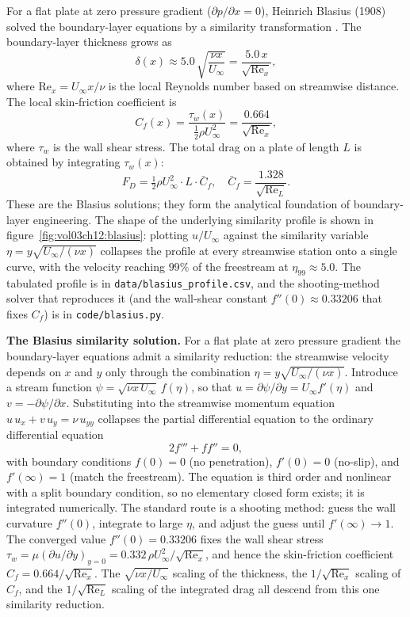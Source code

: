 

For a flat plate at zero pressure gradient ($\partial p/\partial x
= 0$), Heinrich Blasius (1908) solved the boundary-layer equations
by a similarity transformation
\cite{text:schlichting-boundary-layer}. The boundary-layer
thickness grows as
\[
\delta(x) \approx 5.0\,\sqrt{\frac{\nu x}{U_\infty}} =
\frac{5.0\,x}{\sqrt{\text{Re}_x}},
\]
where $\text{Re}_x = U_\infty x/\nu$ is the local Reynolds number
based on streamwise distance. The local skin-friction coefficient
is
\[
C_f(x) = \frac{\tau_w(x)}{\tfrac{1}{2}\rho U_\infty^2} =
\frac{0.664}{\sqrt{\text{Re}_x}},
\]
where $\tau_w$ is the wall shear stress. The total drag on a plate
of length $L$ is obtained by integrating $\tau_w(x)$:
\[
F_D = \tfrac{1}{2}\rho U_\infty^2 \cdot L \cdot \bar{C}_f, \quad
\bar{C}_f = \frac{1.328}{\sqrt{\text{Re}_L}}.
\]
These are the Blasius solutions; they form the analytical
foundation of boundary-layer engineering. The shape of the
underlying similarity profile is shown in
figure~\ref{fig:vol03ch12:blasius}: plotting $u/U_\infty$ against
the similarity variable $\eta = y\sqrt{U_\infty/(\nu x)}$ collapses
the profile at every streamwise station onto a single curve, with
the velocity reaching $99\%$ of the freestream at
$\eta_{99}\approx5.0$. The tabulated profile is in
\texttt{data/blasius\_profile.csv}, and the shooting-method solver
that reproduces it (and the wall-shear constant $f''(0)\approx
0.33206$ that fixes $C_f$) is in \texttt{code/blasius.py}.



\begin{mastery}
\textbf{The Blasius similarity solution.} For a flat plate at zero
pressure gradient the boundary-layer equations admit a similarity
reduction: the streamwise velocity depends on $x$ and $y$ only
through the combination $\eta = y\sqrt{U_\infty/(\nu x)}$. Introduce
a stream function $\psi = \sqrt{\nu x\,U_\infty}\,f(\eta)$, so that
$u = \partial\psi/\partial y = U_\infty f'(\eta)$ and $v =
-\partial\psi/\partial x$. Substituting into the streamwise
momentum equation $u\,u_x + v\,u_y = \nu\,u_{yy}$ collapses the
partial differential equation to the ordinary differential equation
\[
2f''' + f f'' = 0,
\]
with boundary conditions $f(0) = 0$ (no penetration), $f'(0) = 0$
(no-slip), and $f'(\infty) = 1$ (match the freestream). The equation
is third order and nonlinear with a split boundary condition, so no
elementary closed form exists; it is integrated numerically. The
standard route is a shooting method: guess the wall curvature
$f''(0)$, integrate to large $\eta$, and adjust the guess until
$f'(\infty)\to 1$. The converged value $f''(0) = 0.33206$ fixes the
wall shear stress $\tau_w = \mu (\partial u/\partial y)_{y=0} =
0.332\,\rho U_\infty^2/\sqrt{\text{Re}_x}$, and hence the
skin-friction coefficient $C_f = 0.664/\sqrt{\text{Re}_x}$. The
$\sqrt{\nu x/U_\infty}$ scaling of the thickness, the
$1/\sqrt{\text{Re}_x}$ scaling of $C_f$, and the $1/\sqrt{
\text{Re}_L}$ scaling of the integrated drag all descend from this
one similarity reduction.
\end{mastery}


